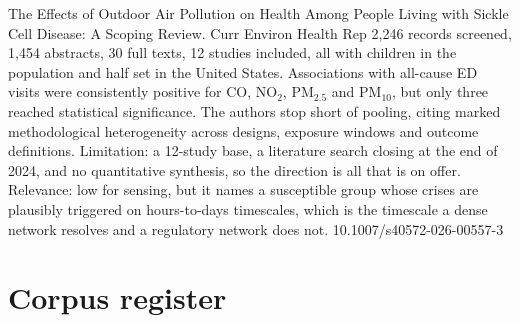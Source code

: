 \documentclass[10pt]{article}
\begin{document}
{The Effects of Outdoor Air Pollution on Health Among People Living with Sickle Cell Disease: A Scoping Review.}
{Curr Environ Health Rep}
{2,246 records screened, 1,454 abstracts, 30 full texts, 12 studies included, all with children in the population and half set in the United States. Associations with all-cause ED visits were consistently positive for CO, NO$_2$, PM$_{2.5}$ and PM$_{10}$, but only three reached statistical significance. The authors stop short of pooling, citing marked methodological heterogeneity across designs, exposure windows and outcome definitions. Limitation: a 12-study base, a literature search closing at the end of 2024, and no quantitative synthesis, so the direction is all that is on offer. Relevance: low for sensing, but it names a susceptible group whose crises are plausibly triggered on hours-to-days timescales, which is the timescale a dense network resolves and a regulatory network does not.}
{10.1007/s40572-026-00557-3}

\clearpage
\section*{\sffamily\bfseries\color{Deep}Corpus register}
\vspace{-1.5mm}{\color{Amber}\rule{\linewidth}{1.1pt}}\vspace{2.5mm}



\vspace{2mm}
\end{document}
